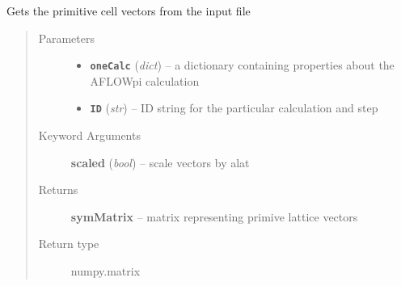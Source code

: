 \documentclass[letterpaper,10pt,english]{sphinxmanual}
\begin{document}
\begin{fulllineitems}
\label{retr:retr.__getCellInput}
Gets the primitive cell vectors from the input file
\begin{quote}\begin{description}
\item[{Parameters}] \leavevmode\begin{itemize}
\item {} 
\textbf{\texttt{oneCalc}} (\emph{dict}) -- a dictionary containing properties about the AFLOWpi calculation

\item {} 
\textbf{\texttt{ID}} (\emph{str}) -- ID string for the particular calculation and step

\end{itemize}

\item[{Keyword Arguments}] \leavevmode
\textbf{scaled} (\emph{bool}) --
scale vectors by alat

\item[{Returns}] \leavevmode
\textbf{symMatrix} --
matrix representing primive lattice vectors

\item[{Return type}] \leavevmode
numpy.matrix

\end{description}\end{quote}

\end{fulllineitems}

\end{document}
